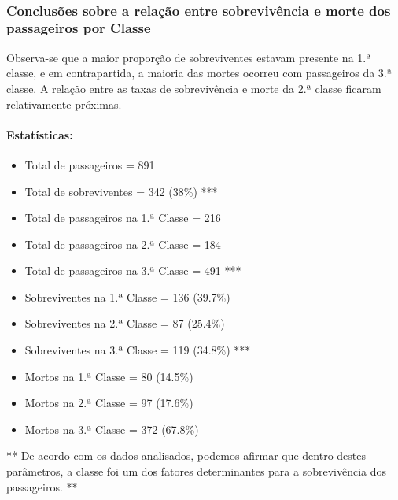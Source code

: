\documentclass[11pt]{article}
\providecommand{\tightlist}{%
      \setlength{\itemsep}{0pt}\setlength{\parskip}{0pt}}
\begin{document}
    \begin{center}
    \end{center}
    { \hspace*{\fill} \\}
    
    \subsubsection{Conclusões sobre a relação entre sobrevivência e morte
dos passageiros por
Classe}\label{conclusuxf5es-sobre-a-relauxe7uxe3o-entre-sobrevivuxeancia-e-morte-dos-passageiros-por-classe}

Observa-se que a maior proporção de sobreviventes estavam presente na
1.ª classe, e em contrapartida, a maioria das mortes ocorreu com
passageiros da 3.ª classe. A relação entre as taxas de sobrevivência e
morte da 2.ª classe ficaram relativamente próximas.

\paragraph{Estatísticas:}\label{estatuxedsticas}

\begin{itemize}
\tightlist
\item
  Total de passageiros = 891
\item
  Total de sobreviventes = 342 (38\%) ***
\item
  Total de passageiros na 1.ª Classe = 216
\item
  Total de passageiros na 2.ª Classe = 184
\item
  Total de passageiros na 3.ª Classe = 491 ***
\item
  Sobreviventes na 1.ª Classe = 136 (39.7\%)
\item
  Sobreviventes na 2.ª Classe = 87 (25.4\%)
\item
  Sobreviventes na 3.ª Classe = 119 (34.8\%) ***
\item
  Mortos na 1.ª Classe = 80 (14.5\%)
\item
  Mortos na 2.ª Classe = 97 (17.6\%)
\item
  Mortos na 3.ª Classe = 372 (67.8\%)
\end{itemize}

** De acordo com os dados analisados, podemos afirmar que dentro destes
parâmetros, a classe foi um dos fatores determinantes para a
sobrevivência dos passageiros. **
\end{document}
